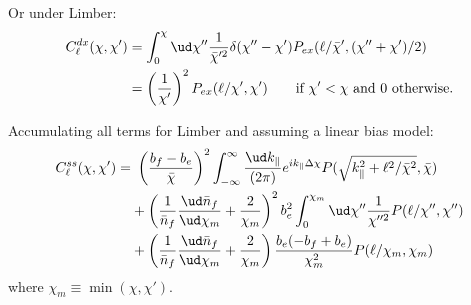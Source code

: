 \begin{widetext}
Or under Limber:
\begin{align}
C^{dx}_\ell(\chi,\chi')
    &=
    \int_0^\chi\ud\chi''
    \frac{1}{\bar\chi^{\prime 2}}
    \delta(\chi'' - \chi')
    P_{ex}(\ell/{\bar\chi'}, (\chi'' + \chi')/2)
    \\
    &=
    \left(\frac{1}{\chi'}\right)^2
    P_{ex}(\ell/\chi', \chi')
    \qquad \textrm{if $\chi' < \chi$ and 0 otherwise.}
\end{align}

Accumulating all terms for Limber and assuming a linear bias model:
\begin{align}
C^{ss}_\ell(\chi, \chi') =&~
    \left(\frac{b_f - b_e }{\bar\chi}\right)^2
        \int_{-\infty}^\infty\frac{\ud k_\parallel}{(2 \pi)} 
        e^{i k_\parallel \Delta\chi}
        P(\sqrt{k_\parallel^2 + \ell^2/\bar\chi^2}, \bar\chi)
    \nonumber \\ &+
    \left(\frac{1}{\bar{n}_f}\frac{\ud \bar{n}_f}{\ud \chi_m}
    + \frac{2}{\chi_m} \right)^2
    b_e^2 \int_0^{\chi_m}\ud\chi''
    \frac{1}{\chi^{\prime\prime 2}}
        P(\ell/\chi'',\chi'')
    \nonumber \\ &+
    \left(\frac{1}{\bar{n}_f}\frac{\ud \bar{n}_f}{\ud \chi_m}
    + \frac{2}{\chi_m} \right)
    \frac{b_e(-b_f + b_e)}{\chi_m^2}
        P(\ell/\chi_m, \chi_m)
\end{align}
where $\chi_m \equiv \min(\chi, \chi')$.

\end{widetext}

